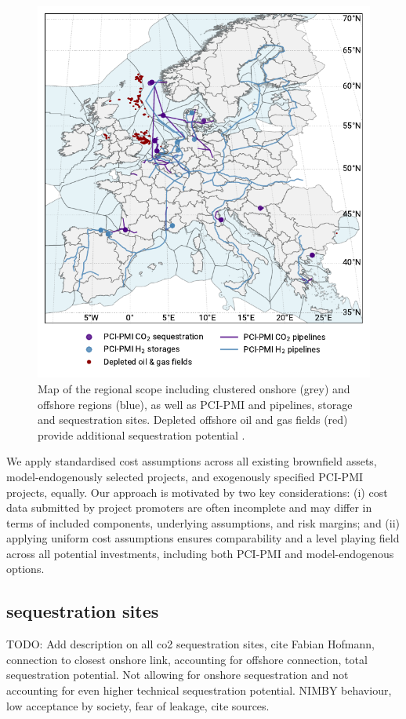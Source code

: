 \documentclass[preprint,12pt,sort&compress]{elsarticle}
\begin{document}
\begin{figure}[htbp]
  \centering
  \includegraphics[width=0.9\linewidth]{map_adm_pcipmi}
  \caption{Map of the regional scope including clustered onshore (grey) and offshore regions (blue), as well as PCI-PMI  and  pipelines, storage and sequestration sites. Depleted offshore oil and gas fields (red) provide additional  sequestration potential \cite{hofmannH2CO2Network2025}.}
  \label{fig:regional_scope_map}
\end{figure}

We apply standardised cost assumptions \cite{zeyenPyPSATechnologydataV01012025} across all existing brownfield assets, model-endogenously selected projects, and exogenously specified PCI-PMI projects, equally. Our approach is motivated by two key considerations: (i) cost data submitted by project promoters are often incomplete and may differ in terms of included components, underlying assumptions, and risk margins; and (ii) applying uniform cost assumptions ensures comparability and a level playing field across all potential investments, including both PCI-PMI and model-endogenous options. 

\subsection{ sequestration sites}
\label{sec:co2_sequestration_sites}
TODO: Add description on all co2 sequestration sites, cite Fabian Hofmann, connection to closest onshore link, accounting for offshore connection, total sequestration potential. Not allowing for onshore sequestration and not accounting for even higher technical sequestration potential. NIMBY behaviour, low acceptance by society, fear of leakage, cite sources. 
\end{document}
